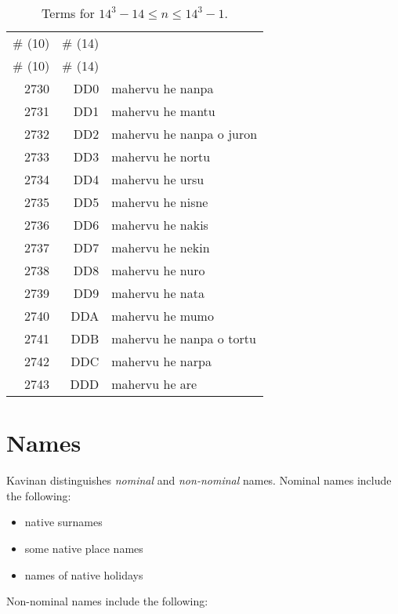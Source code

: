 \documentclass{book}
\begin{document}
\begin{longtabu}[c]{|r|r|X|}
    \caption{Terms for $14^3 - 14 \le n \le 14^3 - 1$.}
    \centering
    
    \\ \hline
    \# (10) & \# (14) & \\
    \hline
    \endfirsthead
    
    \hline
    \# (10) & \# (14) & \\
    \hline
    \endhead
    
    \hline
    \endfoot
    
    \hline
    \endlastfoot
    
    2730 & DD0 & mahervu he nanpa \\
    2731 & DD1 & mahervu he mantu \\
    2732 & DD2 & mahervu he nanpa o juron \\
    2733 & DD3 & mahervu he nortu \\
    2734 & DD4 & mahervu he ursu \\
    2735 & DD5 & mahervu he nisne \\
    2736 & DD6 & mahervu he nakis \\
    2737 & DD7 & mahervu he nekin \\
    2738 & DD8 & mahervu he nuro \\
    2739 & DD9 & mahervu he nata \\
    2740 & DDA & mahervu he mumo \\
    2741 & DDB & mahervu he nanpa o tortu \\
    2742 & DDC & mahervu he narpa \\
    2743 & DDD & mahervu he are \\
\end{longtabu}

\chapter{Names}

Kavinan distinguishes \emph{nominal} and \emph{non-nominal} names. Nominal names include the following:

\begin{itemize}
    \item native surnames
    \item some native place names
    \item names of native holidays
\end{itemize}

Non-nominal names include the following:
\end{document}
